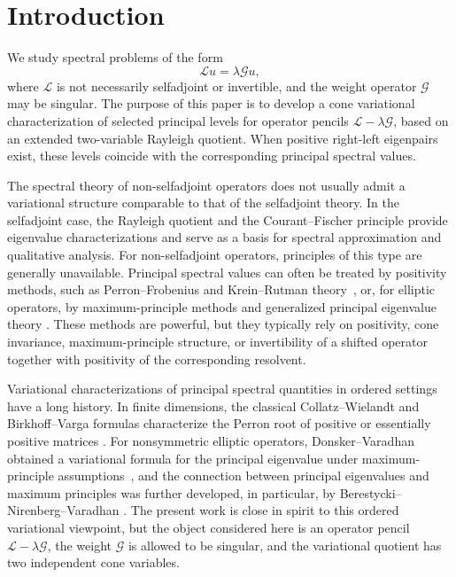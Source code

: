 \documentclass[preprint,10pt]{elsarticle}
\theoremstyle{plain}
\theoremstyle{definition}
\theoremstyle{remark}
\begin{document}

\section{Introduction}

We study spectral problems of the form
\[
\mathcal L u=\lambda \mathcal G u,
\]
where \(\mathcal L\) is not necessarily selfadjoint or invertible, and the
weight operator \(\mathcal G\) may be singular. The purpose of this paper is
to develop a cone variational characterization of selected principal levels
for operator pencils \(\mathcal L-\lambda\mathcal G\), based on an extended
two-variable Rayleigh quotient. When positive right-left eigenpairs exist,
these levels coincide with the corresponding principal spectral values.

The spectral theory of non-selfadjoint operators does not usually admit a
variational structure comparable to that of the selfadjoint theory. In the
selfadjoint case, the Rayleigh quotient and the Courant--Fischer principle
provide eigenvalue characterizations and serve as a basis for spectral
approximation and qualitative analysis. For non-selfadjoint operators,
principles of this type are generally unavailable. Principal spectral values
can often be treated by positivity methods, such as Perron--Frobenius and
Krein--Rutman theory~\cite{KreinRutman}, or, for elliptic operators, by
maximum-principle methods and generalized principal eigenvalue theory
\cite{ProtterWeinberger,BerestNienbVardan,Nussbaum1988,LemmensNussbaum2012}.
These methods are powerful, but they typically rely on positivity, cone
invariance, maximum-principle structure, or invertibility of a shifted operator
together with positivity of the corresponding resolvent.

Variational characterizations of principal spectral quantities in ordered
settings have a long history. In finite dimensions, the classical
Collatz--Wielandt and Birkhoff--Varga formulas characterize the Perron root
of positive or essentially positive matrices
\cite{Birkhoff1957,Collatz1942,Varga1962,Wielandt1950}. For nonsymmetric
elliptic operators, Donsker--Varadhan obtained a variational formula for the
principal eigenvalue under maximum-principle assumptions~\cite{Donsker}, and
the connection between principal eigenvalues and maximum principles was
further developed, in particular, by Berestycki--Nirenberg--Varadhan
\cite{BerestNienbVardan}. The present work is close in spirit to this ordered
variational viewpoint, but the object considered here is an operator pencil
\(\mathcal L-\lambda\mathcal G\), the weight \(\mathcal G\) is allowed to be
singular, and the variational quotient has two independent cone variables.
\end{document}
